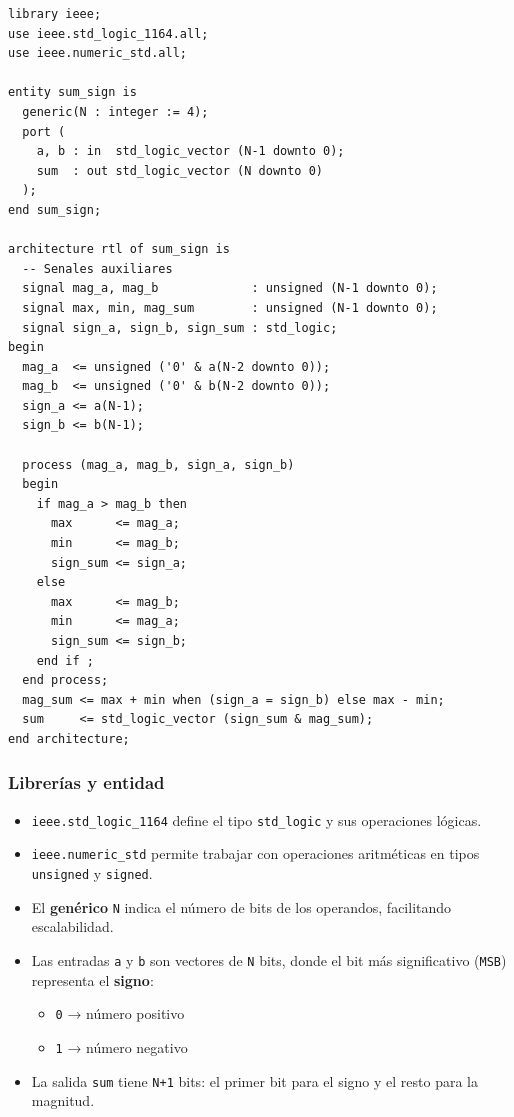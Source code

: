 \documentclass[a4paper,12pt]{article}
\begin{document}
\begin{lstlisting}[caption={Codigo completo sumador}, label={lst:sum_sign}]
library ieee;
use ieee.std_logic_1164.all;
use ieee.numeric_std.all;

entity sum_sign is
  generic(N : integer := 4); 
  port (
    a, b : in  std_logic_vector (N-1 downto 0); 
    sum  : out std_logic_vector (N downto 0) 
  );
end sum_sign;

architecture rtl of sum_sign is
  -- Senales auxiliares 
  signal mag_a, mag_b             : unsigned (N-1 downto 0);
  signal max, min, mag_sum        : unsigned (N-1 downto 0);
  signal sign_a, sign_b, sign_sum : std_logic;
begin
  mag_a  <= unsigned ('0' & a(N-2 downto 0)); 
  mag_b  <= unsigned ('0' & b(N-2 downto 0)); 
  sign_a <= a(N-1); 
  sign_b <= b(N-1); 

  process (mag_a, mag_b, sign_a, sign_b)
  begin
    if mag_a > mag_b then
      max      <= mag_a;
      min      <= mag_b;
      sign_sum <= sign_a; 
    else
      max      <= mag_b;
      min      <= mag_a;
      sign_sum <= sign_b; 
    end if ;
  end process;
  mag_sum <= max + min when (sign_a = sign_b) else max - min; 
  sum     <= std_logic_vector (sign_sum & mag_sum);
end architecture;
\end{lstlisting}

\subsubsection*{Librerías y entidad}
\begin{itemize}
    \item \texttt{ieee.std\_logic\_1164} define el tipo \texttt{std\_logic} y sus operaciones lógicas.
    \item \texttt{ieee.numeric\_std} permite trabajar con operaciones aritméticas en tipos \texttt{unsigned} y \texttt{signed}.
    \item El \textbf{genérico} \texttt{N} indica el número de bits de los operandos, facilitando escalabilidad.
    \item Las entradas \texttt{a} y \texttt{b} son vectores de \texttt{N} bits, donde el bit más significativo (\texttt{MSB}) representa el \textbf{signo}:
    \begin{itemize}
        \item \texttt{0} → número positivo
        \item \texttt{1} → número negativo
    \end{itemize}
    \item La salida \texttt{sum} tiene \texttt{N+1} bits: el primer bit para el signo y el resto para la magnitud.
\end{itemize}
\end{document}
